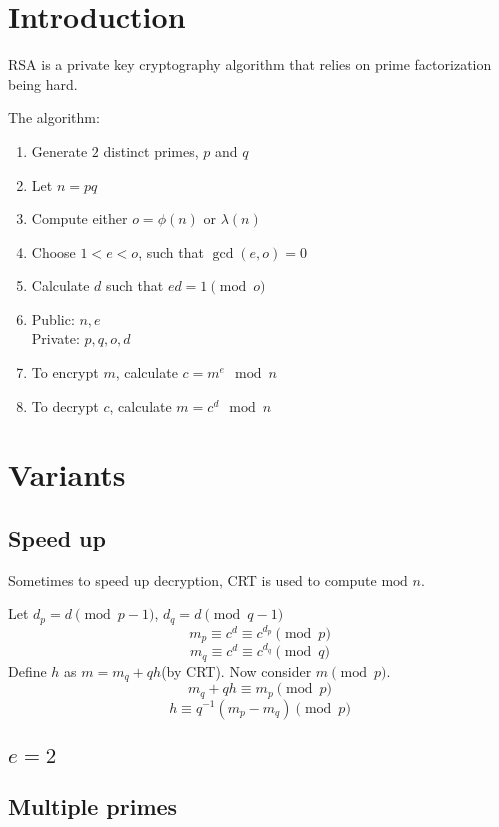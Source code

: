 \documentclass{report}
\newcommand{\tmod}{\text{mod }}
\begin{document}
\section{Introduction}
RSA is a private key cryptography algorithm that relies on prime factorization being hard.

The algorithm:

\begin{enumerate}
	\item Generate $2$ distinct primes, $p$ and $q$
	\item Let $n=pq$
	\item Compute either $o=\phi(n)$ or $\lambda(n)$
	\item Choose $1<e<o$, such that $\gcd(e,o)=0$
	\item Calculate $d$ such that $ed=1\pmod o$
	\item Public: $n,e$\\Private: $p,q,o,d$
	\item To encrypt $m$, calculate $c=m^e\mod n$
	\item To decrypt $c$, calculate $m=c^d\mod n$
\end{enumerate}

\section{Variants}
\subsection{Speed up}
Sometimes to speed up decryption, CRT is used to compute $\tmod n$.

Let $d_p=d\pmod{p-1}$, $d_q=d\pmod{q-1}$
$$m_p\equiv c^d\equiv c^{d_p}\pmod p$$
$$m_q\equiv c^d\equiv c^{d_q}\pmod q$$
Define $h$ as $m=m_q+qh$(by CRT). Now consider $m\pmod p$.
$$m_q+qh\equiv m_p\pmod p$$
$$h\equiv q^{-1}\left(m_p-m_q\right)\pmod p$$
\subsection{$e=2$}
\subsection{Multiple primes}
\end{document}
